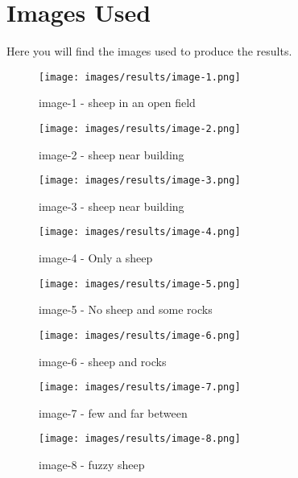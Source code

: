 \chapter{Images Used}
\label{appendix:Images}
 Here you will find the images used to produce the results.
\begin{figure}
    \centering
    \texttt{[image: images/results/image-1.png]}
    \caption{image-1 - sheep in an open field}
    \label{fig:image-1}
\end{figure}
\begin{figure}
    \centering
    \texttt{[image: images/results/image-2.png]}
        \caption{image-2 - sheep near building}
    \label{fig:image-2}
\end{figure}
\begin{figure}
    \centering
    \texttt{[image: images/results/image-3.png]}
            \caption{image-3 - sheep near building}
    \label{fig:image-3}
\end{figure}
\begin{figure}
    \centering
    \texttt{[image: images/results/image-4.png]}
            \caption{image-4 - Only a sheep}
    \label{fig:image-4}
\end{figure}
\begin{figure}
    \centering
    \texttt{[image: images/results/image-5.png]}
            \caption{image-5 - No sheep and some rocks}
    \label{fig:image-5}
\end{figure}
\begin{figure}
    \centering
    \texttt{[image: images/results/image-6.png]}
            \caption{image-6 - sheep and rocks}
    \label{fig:image-6}
\end{figure}
\begin{figure}
    \centering
    \texttt{[image: images/results/image-7.png]}
            \caption{image-7 - few and far between}
    \label{fig:image-7}
\end{figure}
\begin{figure}
    \centering
    \texttt{[image: images/results/image-8.png]}
            \caption{image-8 - fuzzy sheep}
    \label{fig:image-8}
\end{figure}